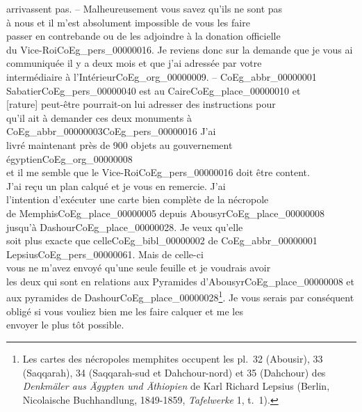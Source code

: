 \documentclass{book}
\begin{document}
arrivassent pas. – Malheureusement vous savez qu’ils ne sont pas\\
à nous et il m’est absolument impossible de vous les faire\\
passer en contrebande ou de les adjoindre à la donation officielle\\
du Vice-Roi\gls{CoEg_pers_00000016}. Je reviens donc sur la demande que je vous ai\\
communiquée il y a deux mois et que j’ai adressée par votre\\
intermédiaire à l’Intérieur\gls{CoEg_org_00000009}. – \gls{CoEg_abbr_00000001} Sabatier\gls{CoEg_pers_00000040} est au Caire\gls{CoEg_place_00000010} et\\
{[rature]} peut-être pourrait-on lui adresser des instructions pour\\
qu’il ait à demander ces deux monuments à \gls{CoEg_abbr_00000003}\gls{CoEg_pers_00000016} J’ai\\
livré maintenant près de 900 objets au gouvernement égyptien\gls{CoEg_org_00000008}\\
et il me semble que le Vice-Roi\gls{CoEg_pers_00000016} doit être content.\\
\indent J’ai reçu un plan calqué et je vous en remercie. J’ai\\
l’intention d’exécuter une carte bien complète de la nécropole\\
de Memphis\gls{CoEg_place_00000005} depuis Abousyr\gls{CoEg_place_00000008} jusqu’à Dashour\gls{CoEg_place_00000028}. Je veux qu’elle\\
soit plus exacte que celle\gls{CoEg_bibl_00000002} de \gls{CoEg_abbr_00000001} Lepsius\gls{CoEg_pers_00000061}. Mais de celle-ci\\
vous ne m’avez envoyé qu’une seule feuille et je voudrais avoir\\
les deux qui sont en relations aux Pyramides d’Abousyr\gls{CoEg_place_00000008} et\\
aux pyramides de Dashour\gls{CoEg_place_00000028}\footnote{Les cartes des nécropoles memphites occupent les pl.~32 (Abousir), 33 (Saqqarah), 34 (Saqqarah-sud et Dahchour-nord) et 35 (Dahchour) des \textit{Denkmäler aus Ägypten und Äthiopien} de Karl Richard Lepsius (Berlin, Nicolaische Buchhandlung, 1849-1859, \textit{Tafelwerke} 1, t.~1).}. Je vous serais par conséquent\\
obligé si vous vouliez bien me les faire calquer et me les\\
envoyer le plus tôt possible.\\
\end{document}

